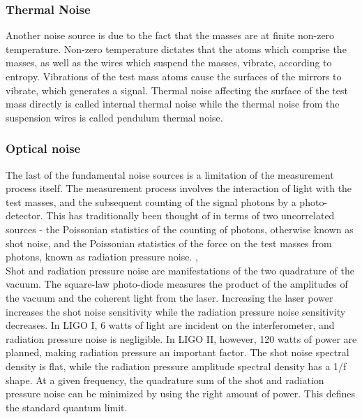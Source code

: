 \subsubsection{Thermal Noise}

Another noise source is due to the fact that the masses are at finite non-zero temperature. Non-zero temperature dictates that the atoms which comprise the masses, as well as the wires which suspend the masses, vibrate, according to entropy. Vibrations of the test mass atoms cause the surfaces of the mirrors to vibrate, which generates a signal. Thermal noise affecting the surface of the test mass directly is called internal thermal noise while the thermal noise from the suspension wires is called pendulum thermal noise.

\subsubsection{Optical noise}

The last of the fundamental noise sources is a limitation of the measurement process itself. The measurement process involves the interaction of light with the test masses, and the subsequent counting of the signal photons by a photo-detector. This has traditionally been thought of in terms of two uncorrelated sources - the Poissonian statistics of the counting of photons, otherwise known as shot noise, and the Poissonian statistics of the force on the test masses from photons, known as radiation pressure noise. \cite{weiss1972electronically} , \cite{saulson1994fundamentals}\\
Shot and radiation pressure noise are manifestations of the two quadrature of the vacuum. The square-law photo-diode measures the product of the amplitudes of the vacuum and the coherent light from the laser. Increasing the laser power increases the shot noise sensitivity while the radiation pressure noise sensitivity decreases. In LIGO I, 6 watts of light are incident on the interferometer, and radiation pressure noise is negligible. In LIGO II, however, 120 watts of power are planned, making radiation pressure an important factor. The shot noise spectral density is flat, while the radiation pressure amplitude spectral density has a 1/f shape. At a given frequency, the quadrature sum of the shot and radiation pressure noise can be minimized by using the right amount of power. This defines the standard quantum limit. \cite{braginsky1995quantum}

